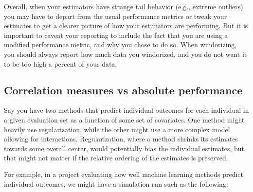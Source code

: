 \documentclass[
]{book}
\begin{document}
Overall, when your estimators have strange tail behavior (e.g., extreme outliers) you may have to depart from the usual performance metrics or tweak your estimates to get a clearer picture of how your estimators are performing.
But it is important to caveat your reporting to include the fact that you are using a modified performance metric, and why you chose to do so.
When windorizing, you should always report how much data you windorized, and you do not want it to be too high a percent of your data.

\subsection{Correlation measures vs absolute performance}\label{correlation-measures-vs-absolute-performance}

Say you have two methods that predict individual outcomes for each individual in a given evaluation set as a function of some set of covariates.
One method might heavily use regularization, while the other might use a more complex model allowing for interactions.
Regularization, where a method shrinks its estimates towards some overall center, would potentially bias the individual estimates, but that might not matter if the relative ordering of the estimates is preserved.

For example, in a project evaluating how well machine learning methods predict individual outcomes, we might have a simulation run such as the following:
\end{document}

